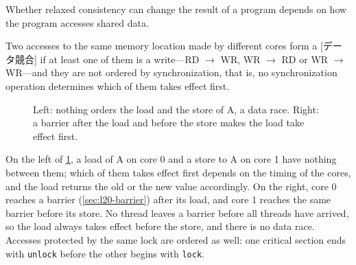\documentclass[../main.tex]{subfiles}
\begin{document}
Whether relaxed consistency can change the result of a program depends on
how the program accesses shared data.

\begin{definition}
  Two accesses to the same memory location made by different cores form a
  [データ競合] if at least one of them is a write---RD $\to$
  WR, WR $\to$ RD or WR $\to$ WR---and they are not ordered by
  synchronization, that is, no synchronization operation determines which of
  them takes effect first.
\end{definition}

\begin{figure}[htbp]
  \centering
  
  \caption{Left: nothing orders the load and the store of A, a data race.
    Right: a barrier after the load and before the store makes the load take
    effect first.}
  \label{fig:l21-race}
\end{figure}

On the left of \cref{fig:l21-race}, a load of A on core 0 and a store to A on
core 1 have nothing between them; which of them takes effect first depends on
the timing of the cores, and the load returns the old or the new value
accordingly.  On the right, core 0 reaches a barrier (\cref{sec:l20-barrier})
after its load, and core 1 reaches the same barrier before its store.  No
thread leaves a barrier before all threads have arrived, so the load always
takes effect before the store, and there is no data race.  Accesses protected
by the same lock are ordered as well: one critical section ends with
\texttt{unlock} before the other begins with \texttt{lock}.
\end{document}

